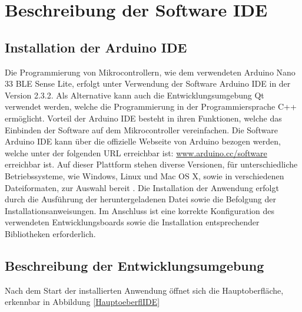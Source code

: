 %
%
%

\chapter{Beschreibung der Software IDE}

\section{Installation der Arduino IDE}

Die Programmierung von Mikrocontrollern, wie dem verwendeten Arduino Nano 33 BLE Sense Lite, erfolgt unter Verwendung der Software Arduino IDE in der Version 2.3.2.  
Als Alternative kann auch die Entwicklungsumgebung Qt verwendet werden, welche die Programmierung in der Programmiersprache C++ ermöglicht.
Vorteil der Arduino IDE besteht in ihren Funktionen, welche das Einbinden der Software auf dem Mikrocontroller vereinfachen.
Die Software Arduino IDE kann über die offizielle Webseite von Arduino bezogen werden, welche unter der folgenden URL erreichbar ist: \url{www.arduino.cc/software} erreichbar ist. Auf dieser Plattform stehen diverse Versionen, für unterschiedliche Betriebssysteme, wie Windows, Linux und Mac OS X, sowie in verschiedenen Dateiformaten, zur Auswahl bereit \cite{ArdIDE.2024}. Die Installation der Anwendung erfolgt durch die Ausführung der heruntergeladenen Datei sowie die Befolgung der Installationsanweisungen. Im Anschluss ist eine korrekte Konfiguration des verwendeten Entwicklungsboards sowie die Installation entsprechender Bibliotheken erforderlich.

\section{Beschreibung der Entwicklungsumgebung}

Nach dem Start der installierten Anwendung öffnet sich die Hauptoberfläche, erkennbar in Abbildung \ref{HauptoeberflIDE}

